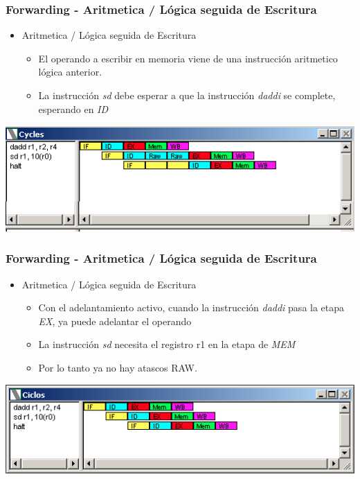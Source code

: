 \documentclass{beamer}
\begin{document}
\begin{frame}[fragile]
\frametitle{Forwarding - Aritmetica / Lógica seguida de Escritura}
\begin{itemize}
\item Aritmetica / Lógica seguida de Escritura
\begin{itemize}
\item El operando a escribir en memoria viene de una instrucción aritmetico lógica anterior.
\item La instrucción \emph{sd} debe esperar a que la instrucción \emph{daddi} se complete, esperando en \emph{ID}
\end{itemize}
\end{itemize}
\includegraphics[scale=0.45]{forwarding-4.png}
\end{frame}

\begin{frame}[fragile]
\frametitle{Forwarding - Aritmetica / Lógica seguida de Escritura}
\begin{itemize}
\item Aritmetica / Lógica seguida de Escritura
\begin{itemize}
\item Con el adelantamiento activo, cuando la instrucción \emph{daddi} pasa la etapa \emph{EX}, ya puede adelantar el operando
\item La instrucción \emph{sd} necesita el registro r1 en la etapa de \emph{MEM}
\item Por lo tanto ya no hay atascos RAW.
\end{itemize}
\end{itemize}
\includegraphics[scale=0.45]{forwarding-4-aritmetica-escritura.png}
\end{frame}
\end{document}
